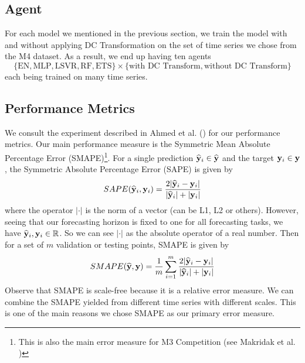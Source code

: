 \subsection{Agent}
For each model we mentioned in the previous section, we train the model with and without applying DC Transformation on the set of time series we chose from the M4 dataset. As a result, we end up having ten agents
\begin{equation*}
    \{\text{EN}, \text{MLP}, \text{LSVR}, \text{RF}, \text{ETS} \} \times \{ \text{with DC Transform}, \text{without DC Transform} \}
\end{equation*}
each being trained on many time series.

\subsection{Performance Metrics}\label{subsec: performance metrics}
We consult the experiment described in Ahmed et al. (\citeyear{2010EmpiricalMLComparison}) for our performance metrics. Our main performance measure is the Symmetric Mean Absolute Percentage Error (SMAPE)\footnote{This is also the main error measure for M3 Competition (see Makridak et al. \citeyear{makridakis2000m3})}. For a single prediction $\widehat{\mathbf{y}}_i \in \widehat{\mathbf{y}}$ and the target $\mathbf{y}_i \in \mathbf{y}$, the Symmetric Absolute Percentage Error (SAPE) is given by
\begin{equation*}
    SAPE(\widehat{\mathbf{y}}_i, \mathbf{y}_i) = \frac{2| \widehat{\mathbf{y}}_i - \mathbf{y}_i|}{|\widehat{\mathbf{y}}_i| + |\mathbf{y}_i| }
\end{equation*}
where the operator $| \cdot |$ is the norm of a vector (can be L1, L2 or others). However, seeing that our forecasting horizon is fixed to one for all forecasting tasks, we have $\widehat{\mathbf{y}}_i, \mathbf{y}_i \in \mathbb{R}$. So we can see $| \cdot |$ as the absolute operator of a real number. Then for a set of $m$ validation or testing points, SMAPE is given by
\begin{equation*}\label{eq: smape}
    SMAPE(\widehat{\mathbf{y}}, \mathbf{y}) = \frac{1}{m} \sum_{i=1}^{m} \frac{2| \widehat{\mathbf{y}}_i - \mathbf{y}_i|}{|\widehat{\mathbf{y}}_i| + |\mathbf{y}_i| }
\end{equation*}
Observe that SMAPE is scale-free because it is a relative error measure. We can combine the SMAPE yielded from different time series with different scales. This is one of the main reasons we chose SMAPE as our primary error measure.

